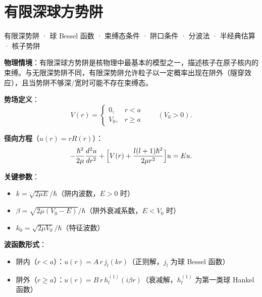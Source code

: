 
\section{有限深球方势阱}
\label{sec:finite-spherical-well}

\begin{tipbox}[关键词标签]
有限深势阱 · 球 Bessel 函数 · 束缚态条件 · 阱口条件 · 分波法 · 半经典估算 · 核子势阱
\end{tipbox}

\begin{modelbox}[模型：球对称有限深势阱中的束缚态]
\textbf{物理情境}：有限深球方势阱是核物理中最基本的模型之一，描述核子在原子核内的束缚。与无限深势阱不同，有限深势阱允许粒子以一定概率出现在阱外（隧穿效应），且当势阱不够深/宽时可能不存在束缚态。

\textbf{势场定义}：
\[
V(r)=\begin{cases}0,&r<a\\V_0,&r\geq a\end{cases}\qquad(V_0>0).
\]

\textbf{径向方程}（$u(r)=rR(r)$）：
\[
-\frac{\hbar^2}{2\mu}\frac{d^2u}{dr^2}+\Bigl[V(r)+\frac{l(l+1)\hbar^2}{2\mu r^2}\Bigr]u=Eu.
\]

\textbf{关键参数}：
\begin{itemize}[nosep]
    \item $k=\sqrt{2\mu E}/\hbar$（阱内波数，$E>0$ 时）
    \item $\beta=\sqrt{2\mu(V_0-E)}/\hbar$（阱外衰减系数，$E<V_0$ 时）
    \item $k_0=\sqrt{2\mu V_0}/\hbar$（特征波数）
\end{itemize}

\textbf{波函数形式}：
\begin{itemize}[nosep]
    \item 阱内（$r<a$）：$u(r)=A\,r\,j_l(kr)$（正则解，$j_l$ 为球 Bessel 函数）
    \item 阱外（$r\geq a$）：$u(r)=B\,r\,h_l^{(1)}(i\beta r)$（衰减解，$h_l^{(1)}$ 为第一类球 Hankel 函数）
\end{itemize}
\end{modelbox}

